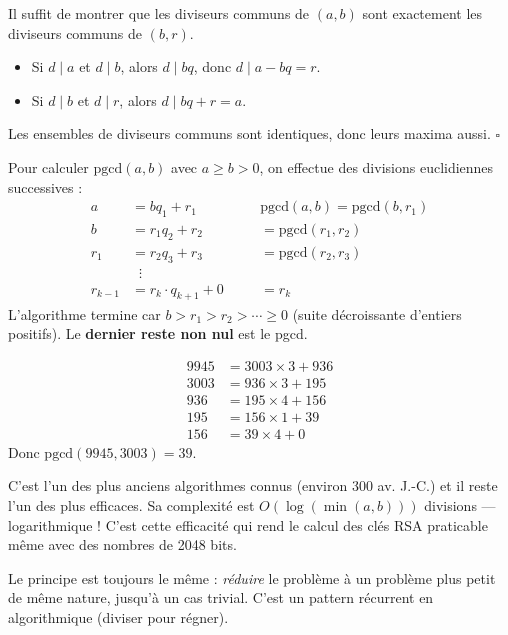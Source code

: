 \begin{proofbox}
Il suffit de montrer que les diviseurs communs de $(a, b)$ sont exactement les diviseurs communs de $(b, r)$.
\begin{itemize}[leftmargin=1cm]
  \item Si $d \mid a$ et $d \mid b$, alors $d \mid bq$, donc $d \mid a - bq = r$.
  \item Si $d \mid b$ et $d \mid r$, alors $d \mid bq + r = a$.
\end{itemize}
Les ensembles de diviseurs communs sont identiques, donc leurs maxima aussi. \hfill$\square$
\end{proofbox}

\begin{methodbox}
Pour calculer $\text{pgcd}(a, b)$ avec $a \geqslant b > 0$, on effectue des divisions euclidiennes successives :
\begin{align*}
  a &= bq_1 + r_1 &\quad &\text{pgcd}(a,b) = \text{pgcd}(b, r_1) \\
  b &= r_1 q_2 + r_2 &\quad &= \text{pgcd}(r_1, r_2) \\
  r_1 &= r_2 q_3 + r_3 &\quad &= \text{pgcd}(r_2, r_3) \\
  &\;\;\vdots \\
  r_{k-1} &= r_k \cdot q_{k+1} + 0 &\quad &= r_k
\end{align*}
L'algorithme termine car $b > r_1 > r_2 > \cdots \geqslant 0$ (suite décroissante d'entiers positifs). Le \textbf{dernier reste non nul} est le pgcd.
\end{methodbox}

\begin{exbox}
\begin{align*}
  9945 &= 3003 \times 3 + 936 \\
  3003 &= 936 \times 3 + 195 \\
  936 &= 195 \times 4 + 156 \\
  195 &= 156 \times 1 + 39 \\
  156 &= 39 \times 4 + 0
\end{align*}
Donc $\text{pgcd}(9945, 3003) = 39$.
\end{exbox}

\begin{intuitionbox}
C'est l'un des plus anciens algorithmes connus (environ 300 av. J.-C.) et il reste l'un des plus efficaces. Sa complexité est $O(\log(\min(a,b)))$ divisions --- logarithmique ! C'est cette efficacité qui rend le calcul des clés RSA praticable même avec des nombres de 2048 bits.

Le principe est toujours le même : \emph{réduire} le problème à un problème plus petit de même nature, jusqu'à un cas trivial. C'est un pattern récurrent en algorithmique (diviser pour régner).
\end{intuitionbox}

